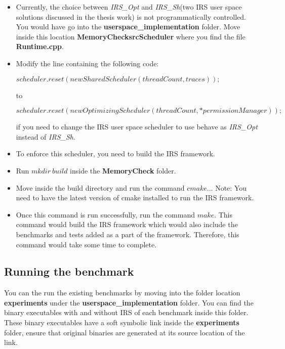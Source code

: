 \documentclass[12pt]{article}
\begin{document}
\begin{itemize}
\item Currently, the choice between \emph{IRS\_Opt} and \emph{IRS\_Sh}(two IRS user space solutions discussed in the thesis work) is not programmatically controlled. 
You would have go into the \textbf{userspace\_implementation} folder. 
Move inside this location \textbf{MemoryCheck\/src\/Scheduler\/} where you find the file \textbf{Runtime.cpp}.
\item Modify the line containing the following code:

$scheduler.reset(new SharedScheduler(threadCount, traces));$

    to 

$scheduler.reset(new OptimizingScheduler(threadCount, *permissionManager));$ 

if you need to change the IRS user space scheduler to use behave as \emph{IRS\_Opt} instead of \emph{IRS\_Sh}. 
\item To enforce this scheduler, you need to build the IRS framework. 
\item Run $mkdir\ build$  inside the \textbf{MemoryCheck} folder. 
\item Move inside the build directory and run the command $cmake ..$. 
Note: You need to have the latest version of cmake installed to run the IRS framework.
\item Once this command is run successfully, run the command $make$. 
This command would build the IRS framework which would also include the benchmarks and tests added as a part of the framework. 
Therefore, this command would take some time to complete. 
\end{itemize}

\subsection*{Running the benchmark}

You can the run the existing benchmarks by moving into the folder location \textbf{experiments} under the \textbf{userspace\_implementation} folder. 
You can find the binary executables with and without IRS of each benchmark inside this folder. 
These binary executables have a soft symbolic link inside the \textbf{experiments} folder, ensure that original binaries are generated at its source location of the link. 
\end{document}
